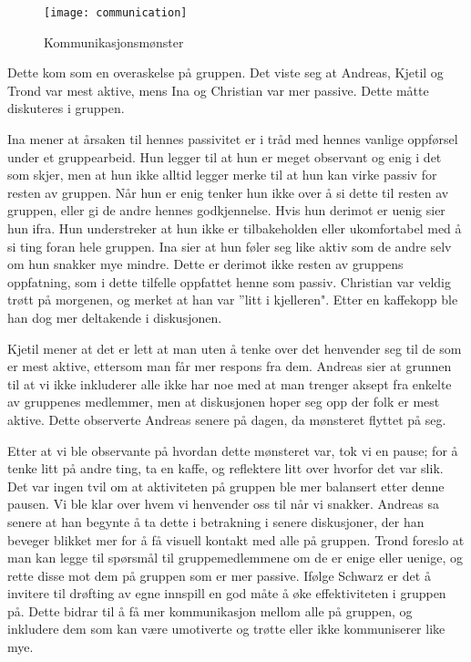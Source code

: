 \begin{figure} [here]
	\begin{center}
			\texttt{[image: communication]}
	\end{center}
	\caption{Kommunikasjonsmønster}
	\label{fig:pattern}
\end{figure}

Dette kom som en overaskelse på gruppen. Det viste seg at Andreas,
Kjetil og Trond var mest aktive, mens Ina og Christian var mer passive.
Dette måtte diskuteres i gruppen.

Ina mener at årsaken til hennes passivitet er i tråd med hennes
vanlige oppførsel under et gruppearbeid. Hun legger til at hun er meget
observant og enig i det som skjer, men at hun ikke alltid legger merke
til at hun kan virke passiv for resten av gruppen. Når hun er enig
tenker hun ikke over å si dette til resten av gruppen, eller gi de andre
hennes godkjennelse. Hvis hun derimot er uenig sier hun ifra. Hun
understreker at hun ikke er tilbakeholden eller ukomfortabel med å si
ting foran hele gruppen. Ina sier at hun føler seg like aktiv som de
andre selv om hun snakker mye mindre. Dette er derimot ikke resten av
gruppens oppfatning, som i dette tilfelle oppfattet henne som passiv.
Christian var veldig trøtt på morgenen, og merket at han var ''litt i
kjelleren". Etter en kaffekopp ble han dog mer deltakende i diskusjonen.

Kjetil mener at det er lett at man uten å tenke over det henvender
seg til de som er mest aktive, ettersom man får mer respons fra dem.
Andreas sier at grunnen til at vi ikke inkluderer alle ikke har noe med
at man trenger aksept fra enkelte av gruppenes medlemmer, men at
diskusjonen hoper seg opp der folk er mest aktive. Dette observerte
Andreas senere på dagen, da mønsteret flyttet på seg.


Etter at vi ble observante på hvordan dette mønsteret var, tok vi en
pause; for å tenke litt på andre ting, ta en kaffe, og reflektere litt
over hvorfor det var slik. Det var ingen tvil om at aktiviteten på
gruppen ble mer balansert etter denne pausen. Vi ble klar over hvem vi
henvender oss til når vi snakker. Andreas sa senere at han begynte å ta
dette i betrakning i senere diskusjoner, der han beveger blikket mer for
å få visuell kontakt med alle på gruppen. Trond foreslo at man kan legge
til spørsmål til gruppemedlemmene om de er enige eller uenige, og rette
disse mot dem på gruppen som er mer passive. Ifølge Schwarz
\cite{Schwarz} er det å invitere til drøfting av egne innspill en god
måte å øke effektiviteten i gruppen på. Dette bidrar til å få mer
kommunikasjon mellom alle på gruppen, og inkludere dem som kan være
umotiverte og trøtte eller ikke kommuniserer like mye. 


